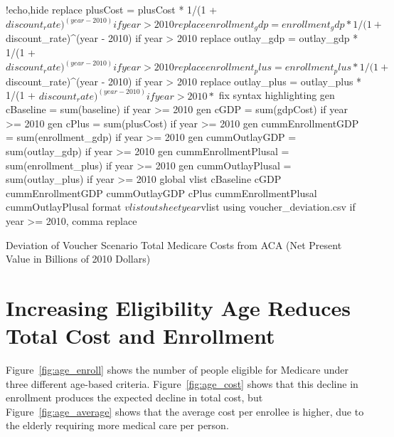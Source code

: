 \documentclass{article}
\begin{document}
\begin{Statacode}{!echo,hide}
replace plusCost = plusCost * 1/(1 + $discount_rate)^(year - 2010) if year > 2010
replace enrollment_gdp = enrollment_gdp * 1/(1 + $discount_rate)^(year - 2010) if year > 2010
replace outlay_gdp = outlay_gdp * 1/(1 + $discount_rate)^(year - 2010) if year > 2010
replace enrollment_plus = enrollment_plus * 1/(1 + $discount_rate)^(year - 2010) if year > 2010
replace outlay_plus = outlay_plus * 1/(1 + $discount_rate)^(year - 2010) if year > 2010
* $ fix syntax highlighting
gen cBaseline = sum(baseline) if year >= 2010
gen cGDP = sum(gdpCost) if year >= 2010
gen cPlus = sum(plusCost) if year >= 2010
gen cummEnrollmentGDP = sum(enrollment_gdp) if year >= 2010
gen cummOutlayGDP = sum(outlay_gdp) if year >= 2010
gen cummEnrollmentPlusal = sum(enrollment_plus) if year >= 2010
gen cummOutlayPlusal = sum(outlay_plus) if year >= 2010
global vlist cBaseline cGDP cummEnrollmentGDP cummOutlayGDP cPlus cummEnrollmentPlusal cummOutlayPlusal 
format $vlist %
outsheet year $vlist using voucher_deviation.csv if year >= 2010, comma replace
\end{Statacode}

\begin{table}[ht]
\centering
\caption{Deviation of Voucher Scenario Total Medicare Costs from ACA (Net Present Value in Billions of 2010 Dollars)}
\label{tab:voucher_deviation}
\end{table}

\section{Increasing Eligibility Age Reduces Total Cost and Enrollment}

Figure~\ref{fig:age_enroll} shows the number of people eligible for Medicare under three different age-based criteria.
Figure~\ref{fig:age_cost} shows that this decline in enrollment produces the expected decline in total cost, but Figure~\ref{fig:age_average} shows that the average cost per enrollee is higher, due to the elderly requiring more medical care per person.
\end{document}
